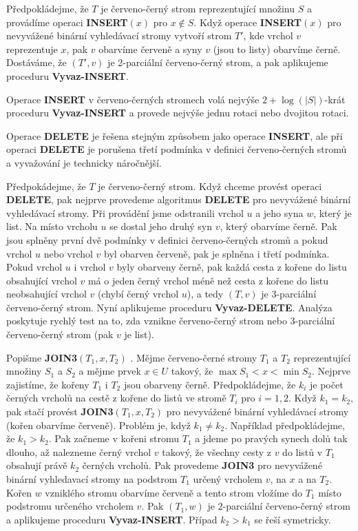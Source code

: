 \documentclass[a4paper,12pt]{article}
\begin{document}
  
Před\-po\-klá\-dejme, že $T$ je červeno-černý strom reprezentující 
množinu $S$ a pro\-vá\-dí\-me operaci {\bf INSERT$(x)$} pro $
x\notin S$.  Když 
ope\-race {\bf IN\-SERT$(x)$} pro nevyvážené binární vyhledávací stro\-my 
vytvoří strom $T'$, kde vrchol $v$ reprezentuje $x$, pak $
v$ 
obar\-ví\-me červeně a syny $v$ (jsou to listy) obarvíme černě.  
Dostáváme, že $(T',v)$ je 2-parciální červeno-černý strom, a pak 
aplikujeme proceduru {\bf Vyvaz-INSERT}.  

Operace {\bf INSERT} v červeno-černých stromech 
volá nejvýše $2+\log(|S|)$-krát proceduru {\bf Vyvaz-INSERT} a 
provede nejvýše jednu rotaci nebo dvojitou rotaci.

Operace {\bf DELETE} je řešena stejným způsobem 
jako ope\-race {\bf INSERT}, ale při operaci {\bf DELETE} je porušena třetí 
pod\-mín\-ka v definici červeno-černých stro\-mů a 
vyvažování je technicky náročnější. 
 
Předpokádejme, že $T$ je červeno-černý strom. Když chceme 
provést operaci {\bf DELETE}, pak nejprve provedeme algoritmus {\bf DELETE} 
pro nevyvážené 
binární vyhledávací stro\-my. Při provádění jsme 
odstranili vrchol $u$ a jeho syna $w$, který je list. Na 
místo vrcholu $u$ se dostal jeho druhý syn $v$, který 
obarvíme černě. Pak jsou splněny první 
dvě podmínky v definici červeno-černých 
stromů a pokud vrchol $u$ nebo vrchol $v$ byl
obarven červeně, pak je splněna i 
třetí podmínka. Pokud vrchol $u$ i vrchol $v$ byly obarveny 
černě, pak každá cesta z kořene do listu obsahující 
vrchol $v$ má o jeden černý  vrchol méně  než cesta z 
kořene do listu neobsahující vrchol $v$ (chybí černý  
vrchol $u$), a tedy $(T,v)$ je 3-parciální červeno-černý strom. 
Nyní aplikujeme proceduru {\bf Vyvaz-DELETE}.
Analýza poskytuje rychlý test na to, zda 
vznikne červeno-černý strom nebo 3-parciální 
červeno-černý strom (pak $v$ je list). 

Popišme {\bf JOIN3$
(T_1,x,T_2)$ }. Mějme červeno-černé stromy $T_1$ a $T_2$ reprezentující 
množiny $S_1$ a $S_2$ a mějme prvek $x\in U$ takový, že 
$\max S_1<x<\min S_2$.  Nejprve zajistíme, že kořeny $T_
1$ i $T_2$ jsou 
obarveny černě.  Předpokládejme, že $k_i$ je počet černých 
vrcholů na cestě z kořene do listů ve stromě 
$T_i$ pro $i=1,2$.  Když $k_1=k_2$, pak stačí provést {\bf JOIN3$
(T_1,x,T_2)$ }
pro nevyvážené binární vyhledávací stromy (kořen obarvíme 
červeně).  Problém je, když $k_1\ne k_2$.  Například 
předpokládejme, že $k_1>k_2$.  Pak začneme v kořeni stromu $
T_1$ a 
jdeme po pravých synech dolů tak dlouho, až nalezneme 
černý vrchol $v$ takový, že všechny cesty z $v$ do listů 
v $T_1$ obsahují právě $k_2$ černých vrcholů.  Pak 
provedeme {\bf JOIN3} pro nevyvážené binární vyhledavací stromy 
na podstrom $T_1$ určený vrcholem $v$, na $x$ a na $T_2$. Kořen $
w$ 
vzniklého stromu obarvíme červeně a tento strom vložíme do 
$T_1$ místo podstromu určeného vrcholem $v$. Pak $(T_1,w
)$ je 
$2$-parciální červeno-černý strom a aplikujeme proceduru 
{\bf Vyvaz-INSERT}. Případ $k_2>k_1$ se řeší symetricky. 
\end{document}
